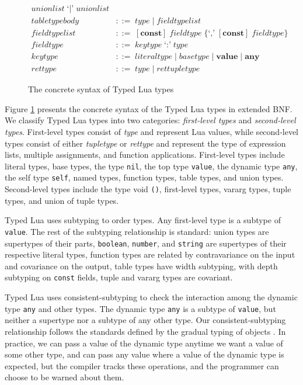 \begin{figure}[!ht]
\begin{align*}
  \textit{unionlist} \; \texttt{`|'} \; \textit{unionlist}\\
\textit{tabletypebody} & ::= \; \textit{type} \; | \; \textit{fieldtypelist}\\
\textit{fieldtypelist} & ::= \; [\textbf{const}] \; \textit{fieldtype} \; \{\texttt{`,'} \; [\textbf{const}] \; \textit{fieldtype}\}\\ 
\textit{fieldtype} & ::= \; \textit{keytype} \; \texttt{`:'} \; \textit{type}\\
\textit{keytype} & ::= \; \textit{literaltype} \; | \;
  \textit{basetype} \; | \;
  \textbf{value} \; | \;
  \textbf{any}\\
\textit{rettype} & ::= \; \textit{type} \; | \; \textit{rettupletype}
\end{align*}
\dend
\caption{The concrete syntax of Typed Lua types}
\label{fig:types}
\end{figure}

Figure \ref{fig:types} presents the concrete syntax of the
Typed Lua types in extended BNF.
We classify Typed Lua types into two categories:
\emph{first-level types} and \emph{second-level types}.
First-level types consist of \emph{type} and represent Lua values,
while second-level types consist of either \emph{tupletype} or
\emph{rettype} and represent the type of expression lists,
multiple assignments, and function applications.
First-level types include literal types, base types, the type \texttt{nil},
the top type \texttt{value}, the dynamic type \texttt{any},
the self type \texttt{self}, named types, function types, table types,
and union types.
Second-level types include the type void \texttt{()}, first-level types,
vararg types, tuple types, and union of tuple types.

Typed Lua uses subtyping to order types.
Any first-level type is a subtype of \texttt{value}.
The rest of the subtyping relationship is standard:
union types are supertypes of their parts,
\texttt{boolean}, \texttt{number}, and \texttt{string} are supertypes
of their respective literal types,
function types are related by contravariance on the input
and covariance on the output, table types have width subtyping,
with depth subtyping on \texttt{const} fields, tuple and vararg types
are covariant.

Typed Lua uses consistent-subtyping to check the interaction among the
dynamic type \texttt{any} and other types.
The dynamic type \texttt{any} is a subtype of \texttt{value}, but neither
a supertype nor a subtype of any other type.
Our consistent-subtyping relationship follows the standards defined
by the gradual typing of objects \citep{siek2007objects,siek2013mutable}.
In practice, we can pass a value of the dynamic type anytime we want
a value of some other type, and can pass any value where a
value of the dynamic type is expected, but the compiler tracks these
operations, and the programmer can choose to be warned about them.

